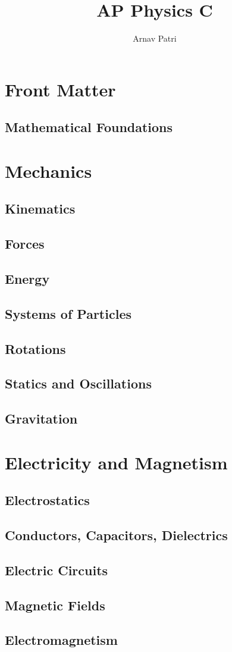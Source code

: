 \documentclass[12pt, A4]{report}
\title{AP Physics C}
\author{Arnav Patri}
\begin{document}
	\maketitle
	\tableofcontents
	\part{Front Matter}
		\chapter{Mathematical Foundations}
			
	\part{Mechanics}
		\chapter{Kinematics}
			
		\chapter{Forces}
			
		\chapter{Energy}
			
		\chapter{Systems of Particles}
			
		\chapter{Rotations}
			
		\chapter{Statics and Oscillations}
			
		\chapter{Gravitation}
			
	\part{Electricity and Magnetism}
		\chapter{Electrostatics}
			
		\chapter{Conductors, Capacitors, Dielectrics}
		\chapter{Electric Circuits}
		\chapter{Magnetic Fields}
		\chapter{Electromagnetism}
\end{document}

